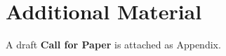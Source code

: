 \section{Additional Material}
\label{sec:Appendix}

A draft \textbf{Call for Paper} is attached as Appendix.


\newpage

